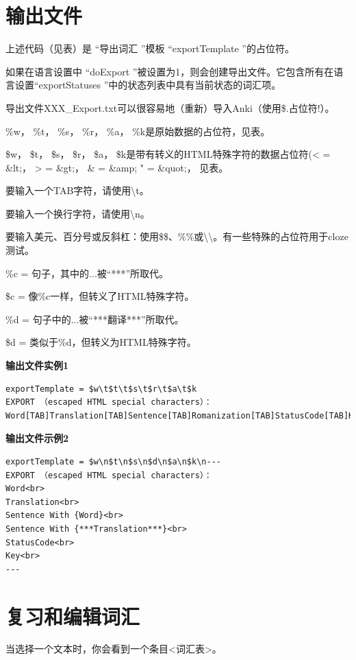 \documentclass[cn,10pt,math=newtx,citestyle=gb7714-2015,bibstyle=gb7714-2015]{elegantbook}
\begin{document}
\chapter{输出文件}\label{输出文件}
上述代码（见表）是 “导出词汇 ”模板 “exportTemplate ”的占位符。

如果在语言设置中 “doExport ”被设置为1，则会创建导出文件。它包含所有在语言设置“exportStatuses ”中的状态列表中具有当前状态的词汇项。

导出文件XXX\_Export.txt可以很容易地（重新）导入Anki（使用\$.占位符!）。

\%w， \%t， \%s， \%r， \%a， \%k是原始数据的占位符，见表。

\$w， \$t， \$s， \$r， \$a， \$k是带有转义的HTML特殊字符的数据占位符(< = \&lt;， > = \&gt;， \& =
\&amp; " = \&quot;， 见表。

要输入一个TAB字符，请使用\textbackslash t。

要输入一个换行字符，请使用\textbackslash n。

要输入美元、百分号或反斜杠：使用\$\$、\%\%或\textbackslash\textbackslash。有一些特殊的占位符用于cloze测试。

\%c = 句子，其中的{...}被“{***}”所取代。

\$c = 像\%c一样，但转义了HTML特殊字符。

\%d = 句子中的{...}被“{***翻译***}”所取代。

\$d = 类似于\%d，但转义为HTML特殊字符。

\textbf{输出文件实例1}

\begin{lstlisting}
exportTemplate = $w\t$t\t$s\t$r\t$a\t$k
EXPORT （escaped HTML special characters）：
Word[TAB]Translation[TAB]Sentence[TAB]Romanization[TAB]StatusCode[TAB]Key
\end{lstlisting}

\textbf{输出文件示例2}

\begin{lstlisting}
exportTemplate = $w\n$t\n$s\n$d\n$a\n$k\n---
EXPORT （escaped HTML special characters）：
Word<br>
Translation<br>
Sentence With {Word}<br>
Sentence With {***Translation***}<br>
StatusCode<br>
Key<br>
---
\end{lstlisting}


\chapter{复习和编辑词汇}\label{复习和编辑词汇}
当选择一个文本时，你会看到一个条目<词汇表>。
\end{document}
